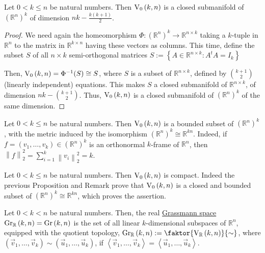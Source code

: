 \begin{proposition}\label{prop:StO_dim_closed} Let $0<k\leq n$ be natural numbers. Then $\StO{k}{n}$ is a closed submanifold of ${\left(\mathbb{R}^n\right)}^k$ of dimension $nk-\frac{k(k+1)}{2}$.
\end{proposition}
\begin{proof}
We need again the homeomorphism $\Phi:{\left(\mathbb{R}^n\right)}^k\to\mathbb{R}^{n\times k}$ taking a $k$-tuple in $\mathbb{R}^n$ to the matrix in $\mathbb{R}^{k\times n}$ having these vectors as columns. This time, define the subset $S$ of all $n\times k$ semi-orthogonal matrices
$S:=\left\{A\in\mathbb{R}^{n\times k}:A^t A=I_k\right\}$

Then,
$\StO{k}{n}=\Phi^{-1}(S)\cong S$,
where $S$ is a subset of $\mathbb{R}^{n\times k}$, defined by $\binom{k+1}{2}$ (linearly independent) equations. This makes $S$ a closed submanifold of $\mathbb{R}^{n\times k}$, of dimension $nk-\binom{k+1}{2}$. Thus, $\StO{k}{n}$ is a closed submanifold of ${\left(\mathbb{R}^n\right)}^k$ of the same dimension.
\end{proof}
\begin{remark} Let $0<k\leq n$ be natural numbers. Then $\StO{k}{n}$ is a bounded subset of ${\left(\mathbb{R}^n\right)}^k$, with the metric induced by the isomorphism ${\left(\mathbb{R}^n\right)}^k\cong\mathbb{R}^{kn}$. Indeed, if $f=(v_1,\ldots,v_k)\in{\left(\mathbb{R}^n\right)}^k$ is an orthonormal $k$-frame of $\mathbb{R}^n$, then
$\left\|f\right\|_2^2=\sum_{i=1}^k\left\|v_i\right\|_2^2=k$.
\end{remark}

\begin{lemma}\label{lem:StO_compact} Let $0<k\leq n$ be natural numbers. Then $\StO{k}{n}$ is compact. Indeed the previous Proposition and Remark prove that $\StO{k}{n}$ is a closed and bounded subset of ${\left(\mathbb{R}^n\right)}^k\cong\mathbb{R}^{kn}$, which proves the assertion.
\end{lemma}

\begin{definition} Let $0<k<n$ be natural numbers. Then, the real \ul{Grassmann space} $\Gr{k}{n}{\mathbb{R}}=\Gr{k}{n}$ is the set of all linear $k$-dimensional subspaces of $\mathbb{R}^n$, equipped with the quotient topology,
$\Gr{k}{n}{\mathbb{R}}:=\faktor{\St{k}{n}{\mathbb{R}}}{\sim}$,
where $(\vec{v}_1,\ldots,\vec{v}_k)\sim(\vec{u}_1,\ldots,\vec{u}_k)$, if $\left<\vec{v}_1,\ldots,\vec{v}_k\right>=\left<\vec{u}_1,\ldots,\vec{u}_k\right>$.
\end{definition}

